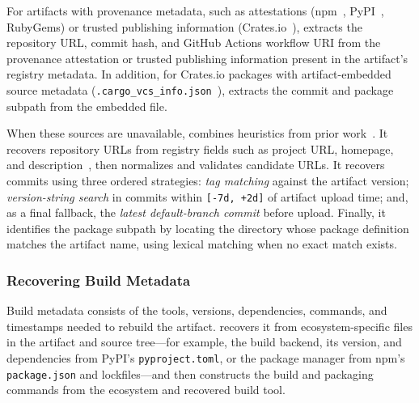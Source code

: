 For artifacts with provenance metadata, such as attestations (npm~\cite{npm-provenance}, PyPI~\cite{pep740}, RubyGems) or trusted publishing information (Crates.io~\cite{crates-trusted-publishing}), \toolname extracts the repository URL, commit hash, and GitHub Actions workflow URI from the provenance attestation or trusted publishing information present in the artifact's registry metadata.
In addition, for Crates.io packages with artifact-embedded source metadata (\eg \texttt{.cargo\_vcs\_info.json}~\cite{cargo-package}), \toolname extracts the commit and package subpath from the embedded file.

When these sources are unavailable, \toolname combines heuristics from prior work~\cite{hassanshahiUnlockingReproducibilityAutomating2025, google_oss_rebuild, keshani_aroma_2024}.
It recovers repository URLs from registry fields such as project URL, homepage, and description~\cite{gao_pyradar_2024, vu_lastpymile_2021}, then normalizes and validates candidate URLs.
It recovers commits using three ordered strategies: \textit{tag matching} against the artifact version; \textit{version-string search} in commits within \texttt{[-7d, +2d]} of artifact upload time; and, as a final fallback, the \textit{latest default-branch commit} before upload.
Finally, it identifies the package subpath by locating the directory whose package definition matches the artifact name, using lexical matching when no exact match exists.

\subsubsection{Recovering Build Metadata}

Build metadata consists of the tools, versions, dependencies, commands, and timestamps needed to rebuild the artifact. \toolname recovers it from ecosystem-specific files in the artifact and source tree---for example, the build backend, its version, and dependencies from PyPI's \texttt{pyproject.toml}, or the package manager from npm's \texttt{package.json} and lockfiles---and then constructs the build and packaging commands from the ecosystem and recovered build tool.


